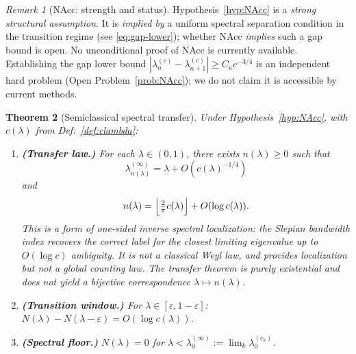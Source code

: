 \documentclass[12pt,a4paper]{amsart}
\newtheorem{theorem}{Theorem}[section]
\theoremstyle{definition}
\theoremstyle{remark}
\newtheorem{remark}[theorem]{Remark}
\begin{document}
\begin{remark}[NAcc: strength and status]
\label{rem:NAcc-strength}
Hypothesis~\ref{hyp:NAcc} is a \emph{strong
structural assumption}.
It is \emph{implied by} a uniform spectral
separation condition in the transition regime
(see \eqref{eq:gap-lower}); whether NAcc
\emph{implies} such a gap bound is open.
No unconditional proof of NAcc is currently
available.
Establishing the gap lower bound
$|\lambda_n^{(c)}-\lambda_{n+1}^{(c)}|\ge C_\kappa c^{-3/4}$
is an independent hard problem
(Open Problem~\ref{prob:NAcc});
we do not claim it is accessible by current methods.
\end{remark}

\begin{theorem}[Semiclassical spectral transfer]
\label{thm:weyl}
Under Hypothesis~\ref{hyp:NAcc},
with $c(\lambda)$ from Def.~\ref{def:clambda}:
\begin{enumerate}[\rm(a)]
\item \textbf{(Transfer law.)}
      For each $\lambda\in(0,1)$,
      there exists $n(\lambda)\ge 0$ such that
      \begin{equation}\label{eq:transfer-exist}
        \lambda_{n(\lambda)}^{(\infty)}
        = \lambda + O\!\left(c(\lambda)^{-1/4}\right)
      \end{equation}
      and
      \begin{equation}\label{eq:transfer-index}
        n(\lambda)
        = \Bigl\lfloor\tfrac{2}{\pi}c(\lambda)\Bigr\rfloor
          + O(\log c(\lambda)).
      \end{equation}
      This is a form of \emph{one-sided inverse
      spectral localization}: the Slepian bandwidth
      index recovers the correct label for the
      closest limiting eigenvalue up to
      $O(\log c)$ ambiguity.
      It is \emph{not} a classical Weyl law,
      and provides localization but not a
      global counting law.
      The transfer theorem is purely existential
      and does not yield a bijective
      correspondence $\lambda\mapsto n(\lambda)$.
\item \textbf{(Transition window.)}
      For $\lambda\in[\varepsilon,1{-}\varepsilon]$:
      $N(\lambda)-N(\lambda-\varepsilon)
      =O(\log c(\lambda))$.
\item \textbf{(Spectral floor.)}
      $N(\lambda)=0$ for
      $\lambda<\lambda_0^{(\infty)}
      :=\lim_k\lambda_0^{(c_k)}$.
\end{enumerate}
\end{theorem}
\end{document}
